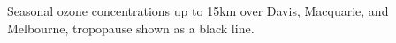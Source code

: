 \label{fig:sondeOzoneSeasons}
Seasonal ozone concentrations up to 15km over Davis, Macquarie, and Melbourne, tropopause shown as a black line.